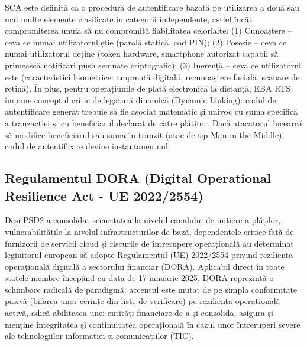 SCA este definită ca o procedură de autentificare bazată pe utilizarea a două sau mai multe elemente clasificate în categorii independente, astfel încât compromiterea unuia să nu compromită fiabilitatea celorlalte: (1) Cunoaștere – ceva ce numai utilizatorul știe (parolă statică, cod PIN); (2) Posesie – ceva ce numai utilizatorul deține (token hardware, smartphone autorizat capabil să primească notificări push semnate criptografic); (3) Inerență – ceva ce utilizatorul este (caracteristici biometrice: amprentă digitală, recunoaștere facială, scanare de retină). În plus, pentru operațiunile de plată electronică la distanță, EBA RTS impune conceptul critic de legătură dinamică (Dynamic Linking): codul de autentificare generat trebuie să fie asociat matematic și univoc cu suma specifică a tranzacției și cu beneficiarul declarat de către plătitor. Dacă atacatorul încearcă să modifice beneficiarul sau suma în tranzit (atac de tip Man-in-the-Middle), codul de autentificare devine instantaneu nul.

\subsection{Regulamentul DORA (Digital Operational Resilience Act - UE 2022/2554)}

Deși PSD2 a consolidat securitatea la nivelul canalului de inițiere a plăților, vulnerabilitățile la nivelul infrastructurilor de bază, dependențele critice față de furnizorii de servicii cloud și riscurile de întrerupere operațională au determinat legiuitorul european să adopte Regulamentul (UE) 2022/2554 privind reziliența operațională digitală a sectorului financiar (DORA). Aplicabil direct în toate statele membre începând cu data de 17 ianuarie 2025, DORA reprezintă o schimbare radicală de paradigmă: accentul este mutat de pe simpla conformitate pasivă (bifarea unor cerințe din liste de verificare) pe reziliența operațională activă, adică abilitatea unei entități financiare de a-și consolida, asigura și menține integritatea și continuitatea operațională în cazul unor întreruperi severe ale tehnologiilor informației și comunicațiilor (TIC).

